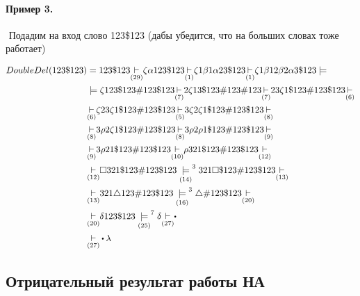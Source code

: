 \newpage

\paragraph*{Пример 3.} ${}$ \newline
Подадим на вход слово 123\$123 (дабы убедится, что на больших словах тоже работает)

\begin{align*}
    DoubleDel(123\$123) &= 123\$123 \underset{(29)}{\step} \zeta\alpha 123\$123
    \underset{(1)}{\step} \zeta 1\beta 1\alpha 23\$123 \underset{(1)}{\step} 
    \zeta 1\beta 1 2\beta 2\alpha 3\$123 \models\\
                        &\models \zeta 123\$123\#123\$123 \underset{(7)}{\step}
                        2\zeta 13\$ 123\#123\#123
                        \underset{(7)}{\step} 23\zeta 1\$123\#123\$123 \underset{(6)}{\step}\\
                        &\underset{(6)}{\step} \zeta 23\zeta 1\$123\#123\$123 \underset{(5)}{\step}
                        3\zeta 2\zeta 1\$123\#123\$123 \underset{(8)}{\step}\\
                        &\underset{(8)}{\step} 3\rho 2\zeta 1\$123\#123\$123
                        \underset{(8)}{\step} 3\rho 2\rho 1\$123\#123\$123 \underset{(9)}{\step}\\
                        &\underset{(9)}{\step}
                        3\rho 21\$123\#123\$123 \underset{(10)}{\step} \rho 321\$123\#123\$123
                        \underset{(12)}{\step}\\
                        &\underset{(12)}{\step} \square 321\$123\#123\$123 \underset{(14)}{\models}^{3}
                        321\square\$123\#123\$123 \underset{(13)}{\step}\\
                        &\underset{(13)}{\step} 321\triangle 123\#
                        123\$123 \underset{(16)}{\models}^{3} \triangle\#123\$123
                        \underset{(20)}{\step}\\
                        &\underset{(20)}{\step} \delta 123\$123 \underset{(25)}{\models}^{7} \delta
                        \underset{(27)}{\step}\bigcdot\\
                        &\underset{(27)}{\step}\bigcdot \lambda
\end{align*}

\subsection{Отрицательный результат работы НА}

